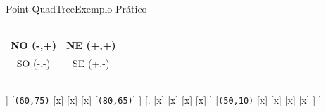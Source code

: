 \documentclass[red, tikz, aspectratio=169, xcolor=dvipsnames]{beamer}
\begin{document}
			\begin{frame}[fragile]{Point QuadTree}{Exemplo Prático}
				\centering
				\vspace{-40px}
				\begin{columns}
					\begin{column}{0.48\textwidth}
						\centering
						\begin{tabular}{|c|c|}
							\hline 
							NO (-,+) & NE (+,+) \\ 
							\hline 
							SO (-,-) & SE (+,-) \\ 
							\hline 
						\end{tabular} 
					\end{column}
					\begin{column}{0.5\textwidth}
						\centering
						\fbox{
							\begin{forest}
								[\texttt{(x,y)}
								[NO]
								[NE]
								[SO]
								[SE]
								]
						\end{forest}}
					\end{column}
				\end{columns}
				\vspace{10px}
				
				\vspace{10px}
				
				\begin{minipage}{\textwidth}
					\centering
					
					\begin{forest}
						[\texttt{(35,40)}
						[.
						[x]
						[x]
						[x]
						[x]
						]
						[\texttt{(60,75)}
						[x]
						[x]
						[x]
						[\texttt{(80,65)}]
						]
						[.
						[x]
						[x]
						[x]
						[x]
						]
						[\texttt{(50,10)}
						[x]
						[x]
						[x]
						[x]
						]
						]
					\end{forest}
				\end{minipage}
			\end{frame}
			
\end{document}
